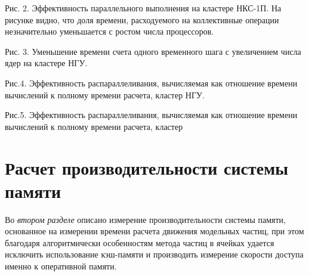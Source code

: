 Рис. 2. Эффективность параллельного выполнения на кластере НКС-1П. На рисунке видно, что доля времени, расходуемого на коллективные операции незначительно уменьшается с ростом числа процессоров.


Рис. 3. Уменьшение времени счета одного временного шага с увеличением числа ядер на кластере НГУ.


Рис.4. Эффективность распараллеливания, вычисляемая как отношение времени вычислений к полному времени расчета, кластер НГУ.

Рис.5. Эффективность распараллеливания, вычисляемая как отношение времени вычислений к полному времени расчета, кластер 





\section{Расчет производительности системы памяти}
\label{perfRAM}
Во \textit{втором разделе} описано измерение производительности системы памяти, основанное на измерении времени расчета движения модельных частиц, при этом благодаря алгоритмически особенностям метода частиц в ячейках удается исключить использование кэш-памяти и производить измерение скорости доступа именно к оперативной памяти.

